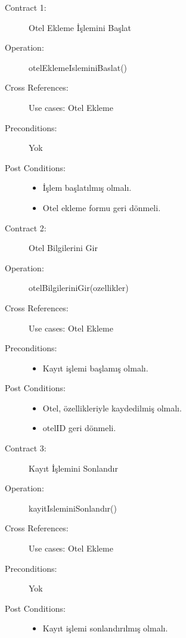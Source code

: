\documentclass[12pt,a4paper]{report}
\begin{document}
\newpage

\begin{description}
\item[Contract 1:] Otel Ekleme İşlemini Başlat
\item[Operation:] otelEklemeIsleminiBaslat()
\item[Cross References:] Use cases: Otel Ekleme
\item[Preconditions:] Yok
\item[Post Conditions:] \hspace{10 mm}
\begin{itemize} 
\item İşlem başlatılmış olmalı.
\item Otel ekleme formu geri dönmeli. \\
\end{itemize}
\end{description}

\begin{description}
\item[Contract 2:] Otel Bilgilerini Gir
\item[Operation:] otelBilgileriniGir(ozellikler)
\item[Cross References:] Use cases: Otel Ekleme
\item[Preconditions:] \hspace{10 mm}
\begin{itemize}
\item Kayıt işlemi başlamış olmalı.
\end{itemize}
\item[Post Conditions:] \hspace{10 mm}
\begin{itemize} 
\item Otel, özellikleriyle kaydedilmiş olmalı.
\item otelID geri dönmeli. \\
\end{itemize}
\end{description}

\begin{description}
\item[Contract 3:] Kayıt İşlemini Sonlandır
\item[Operation:] kayitIsleminiSonlandır()
\item[Cross References:] Use cases: Otel Ekleme
\item[Preconditions:] Yok
\item[Post Conditions:] \hspace{10 mm}
\begin{itemize} 
\item Kayıt işlemi sonlandırılmış olmalı. \\
\end{itemize}
\end{description}
\end{document}
